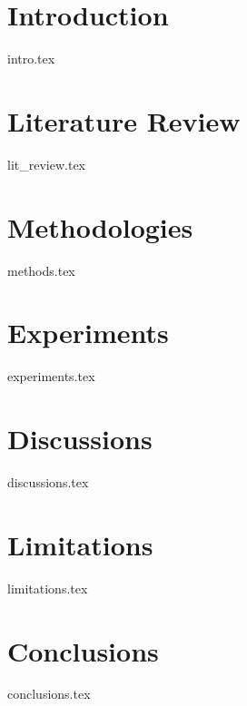 \documentclass[a4paper]{ustthesis}
\begin{document}
\chapter{Introduction}
\label{ch_intro}
{intro.tex}
\newpage


\chapter{Literature Review}
\label{ch_review}
{lit_review.tex}
\newpage

\chapter{Methodologies}
\label{ch_methodologies}
{methods.tex}
\newpage

\chapter{Experiments}
\label{ch_experiments}
{experiments.tex}
\newpage

\chapter{Discussions}
\label{ch_discussions}
{discussions.tex}
\newpage

\chapter{Limitations}
\label{ch_limitations}
{limitations.tex}
\newpage

\chapter{Conclusions}
\label{ch_conclusions}
{conclusions.tex}
\newpage
\end{document}
